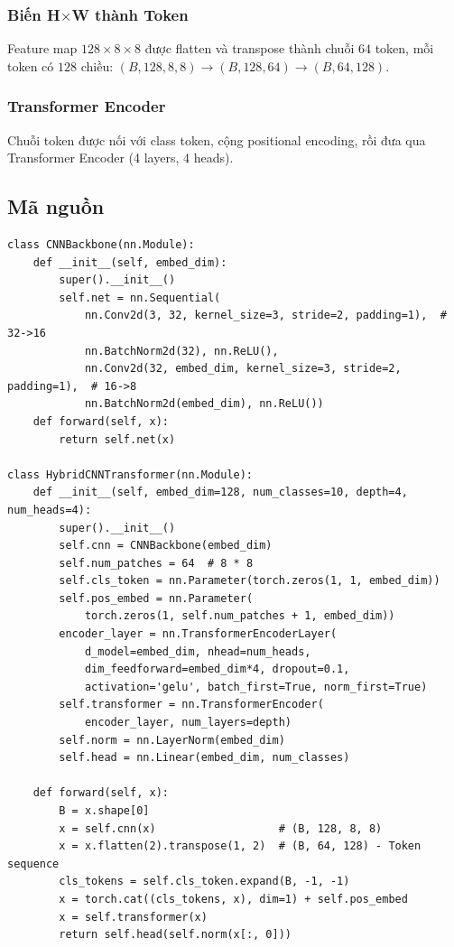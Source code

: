 \documentclass[a4paper]{article}
\theoremstyle{definition}
\begin{document}
\subsubsection{Biến H$\times$W thành Token}
Feature map $128 \times 8 \times 8$ được flatten và transpose thành chuỗi $64$ token, mỗi token có $128$ chiều: $(B, 128, 8, 8) \to (B, 128, 64) \to (B, 64, 128)$.

\subsubsection{Transformer Encoder}
Chuỗi token được nối với class token, cộng positional encoding, rồi đưa qua Transformer Encoder (4 layers, 4 heads).

\subsection{Mã nguồn}
\begin{verbatim}
class CNNBackbone(nn.Module):
    def __init__(self, embed_dim):
        super().__init__()
        self.net = nn.Sequential(
            nn.Conv2d(3, 32, kernel_size=3, stride=2, padding=1),  # 32->16
            nn.BatchNorm2d(32), nn.ReLU(),
            nn.Conv2d(32, embed_dim, kernel_size=3, stride=2, padding=1),  # 16->8
            nn.BatchNorm2d(embed_dim), nn.ReLU())
    def forward(self, x):
        return self.net(x)

class HybridCNNTransformer(nn.Module):
    def __init__(self, embed_dim=128, num_classes=10, depth=4, num_heads=4):
        super().__init__()
        self.cnn = CNNBackbone(embed_dim)
        self.num_patches = 64  # 8 * 8
        self.cls_token = nn.Parameter(torch.zeros(1, 1, embed_dim))
        self.pos_embed = nn.Parameter(
            torch.zeros(1, self.num_patches + 1, embed_dim))
        encoder_layer = nn.TransformerEncoderLayer(
            d_model=embed_dim, nhead=num_heads,
            dim_feedforward=embed_dim*4, dropout=0.1,
            activation='gelu', batch_first=True, norm_first=True)
        self.transformer = nn.TransformerEncoder(
            encoder_layer, num_layers=depth)
        self.norm = nn.LayerNorm(embed_dim)
        self.head = nn.Linear(embed_dim, num_classes)

    def forward(self, x):
        B = x.shape[0]
        x = self.cnn(x)                   # (B, 128, 8, 8)
        x = x.flatten(2).transpose(1, 2)  # (B, 64, 128) - Token sequence
        cls_tokens = self.cls_token.expand(B, -1, -1)
        x = torch.cat((cls_tokens, x), dim=1) + self.pos_embed
        x = self.transformer(x)
        return self.head(self.norm(x[:, 0]))
\end{verbatim}
\end{document}
